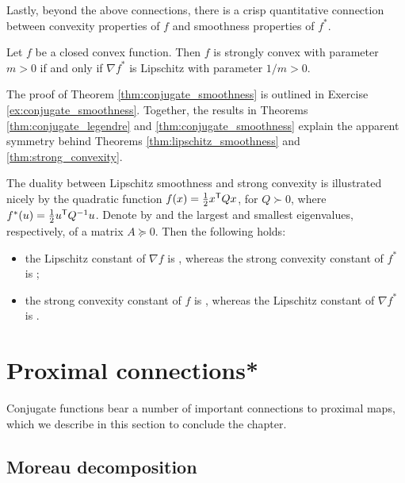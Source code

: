 
Lastly, beyond the above connections, there is a crisp quantitative connection
between convexity properties of $f$ and smoothness properties of $f^*$. 

\begin{Theorem}
\label{thm:conjugate_smoothness}
Let $f$ be a closed convex function. Then $f$ is strongly convex with parameter
$m>0$ if and only if $\nabla f^*$ is Lipschitz with parameter $1/m>0$. 
\end{Theorem}

The proof of Theorem \ref{thm:conjugate_smoothness} is outlined in Exercise
\ref{ex:conjugate_smoothness}. Together, the results in Theorems 
\ref{thm:conjugate_legendre} and \ref{thm:conjugate_smoothness} explain the
apparent symmetry behind Theorems \ref{thm:lipschitz_smoothness} and
\ref{thm:strong_convexity}.    

\medskip

\begin{Example}
The duality between Lipschitz smoothness and strong convexity is illustrated
nicely by the quadratic function $f(x) = \frac{1}{2} x^{\mathsf{T}} Q x$, for $Q \succ
0$, where $f^*(u) = \frac{1}{2} u^{\mathsf{T}} Q^{-1}u$. Denote by
 and  the largest and
smallest eigenvalues, respectively, of a matrix $A \succeq 0$. Then the
following holds:
\begin{itemize}
\item the Lipschitz constant of $\nabla f$ is ,
  whereas the strong convexity constant of $f^*$ is
  ;
\item the strong convexity constant of $f$ is ,
  whereas the Lipschitz constant of $\nabla f^*$ is
  . 
\end{itemize}
\end{Example}

\section{Proximal connections*}

Conjugate functions bear a number of important connections to proximal maps,
which we describe in this section to conclude the chapter.

\subsection{Moreau decomposition}
\label{sec:moreau_decomposition}

